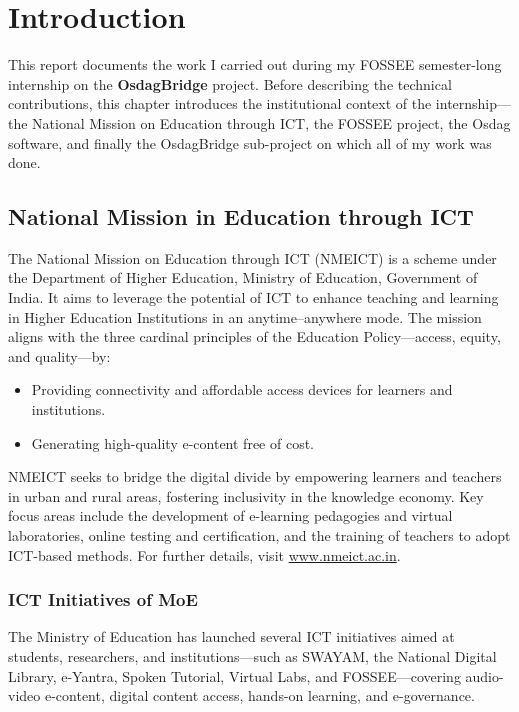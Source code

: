 \chapter{Introduction}
\label{ch:intro}

This report documents the work I carried out during my FOSSEE semester-long internship
on the \textbf{OsdagBridge} project. Before describing the technical contributions, this
chapter introduces the institutional context of the internship---the National Mission on
Education through ICT, the FOSSEE project, the Osdag software, and finally the OsdagBridge
sub-project on which all of my work was done.

\section{National Mission in Education through ICT}
The National Mission on Education through ICT (NMEICT) is a scheme under the Department of
Higher Education, Ministry of Education, Government of India. It aims to leverage the
potential of ICT to enhance teaching and learning in Higher Education Institutions in an
anytime--anywhere mode. The mission aligns with the three cardinal principles of the
Education Policy---access, equity, and quality---by:
\begin{itemize}[leftmargin=1.4em]
  \item Providing connectivity and affordable access devices for learners and institutions.
  \item Generating high-quality e-content free of cost.
\end{itemize}
NMEICT seeks to bridge the digital divide by empowering learners and teachers in urban and
rural areas, fostering inclusivity in the knowledge economy. Key focus areas include the
development of e-learning pedagogies and virtual laboratories, online testing and
certification, and the training of teachers to adopt ICT-based methods. For further details,
visit \url{www.nmeict.ac.in}.

\subsection{ICT Initiatives of MoE}
The Ministry of Education has launched several ICT initiatives aimed at students,
researchers, and institutions---such as SWAYAM, the National Digital Library, e-Yantra,
Spoken Tutorial, Virtual Labs, and FOSSEE---covering audio-video e-content, digital content
access, hands-on learning, and e-governance.

